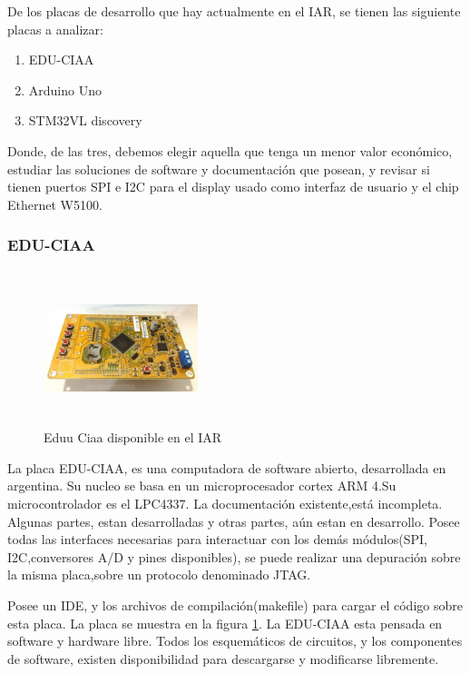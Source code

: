  De los placas de desarrollo que hay actualmente en el IAR, se tienen las siguiente placas a analizar: 
 
\begin{enumerate}
	\item EDU-CIAA
	\item Arduino Uno 
	\item STM32VL discovery 
\end{enumerate}
Donde, de las tres, debemos elegir aquella que tenga un menor valor económico, estudiar las soluciones de software y documentación que posean, y revisar si tienen puertos SPI e I2C para el display usado como interfaz de usuario y el chip Ethernet W5100.  

\subsubsection{EDU-CIAA}

\begin{figure}
	\includegraphics[width=0.4\textwidth , height=  45mm]{edu_ciaa}
	\caption{Eduu Ciaa disponible en el IAR}
	\label{fig:edu_ciaa}
\end{figure}
La placa EDU-CIAA, es una computadora de software abierto, desarrollada en argentina. Su nucleo se basa en un microprocesador cortex ARM 4.Su microcontrolador es el LPC4337. La documentación existente,está incompleta. Algunas partes, estan desarrolladas y otras partes, aún estan en desarrollo. Posee todas las interfaces necesarias para interactuar con los demás módulos(SPI, I2C,conversores A/D y pines disponibles), se puede realizar una depuración sobre la misma placa,sobre un protocolo denominado JTAG. 





Posee un IDE, y los archivos de compilación(makefile) para cargar el código sobre esta placa. La placa se muestra en la figura \ref{fig:edu_ciaa}. La EDU-CIAA esta pensada en software y hardware libre. Todos los esquemáticos de circuitos, y los componentes de software, existen disponibilidad para descargarse y modificarse libremente. 

